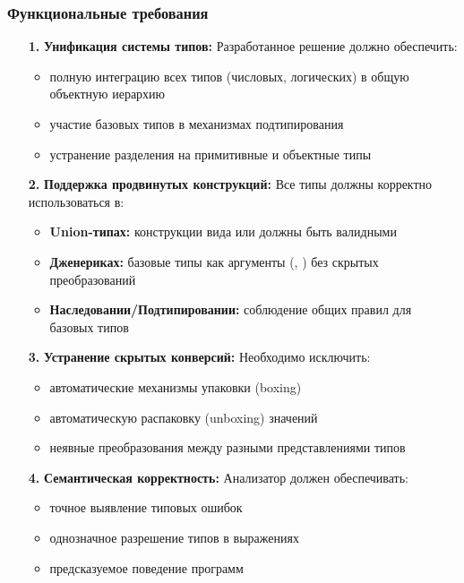\subsubsection{Функциональные требования}
\begin{enumerate}[leftmargin=*,align=left]
    \item[\textbf{1.}] \textbf{Унификация системы типов:} Разработанное решение должно обеспечить:
    \begin{itemize}[label={--}]
        \item полную интеграцию всех типов (числовых, логических) в общую объектную иерархию
        \item участие базовых типов в механизмах подтипирования
        \item устранение разделения на примитивные и объектные типы
    \end{itemize}

    \item[\textbf{2.}] \textbf{Поддержка продвинутых конструкций:} Все типы должны корректно использоваться в:
    \begin{itemize}[label={--}]
        \item \textbf{Union-типах:} конструкции вида  или  должны быть валидными
        \item \textbf{Дженериках:} базовые типы как аргументы (, ) без скрытых преобразований
        \item \textbf{Наследовании/Подтипировании:} соблюдение общих правил для базовых типов
    \end{itemize}

    \item[\textbf{3.}] \textbf{Устранение скрытых конверсий:} Необходимо исключить:
    \begin{itemize}[label={--}]
        \item автоматические механизмы упаковки (boxing)
        \item автоматическую распаковку (unboxing) значений
        \item неявные преобразования между разными представлениями типов
    \end{itemize}

    \item[\textbf{4.}] \textbf{Семантическая корректность:} Анализатор должен обеспечивать:
    \begin{itemize}[label={--}]
        \item точное выявление типовых ошибок
        \item однозначное разрешение типов в выражениях
        \item предсказуемое поведение программ
    \end{itemize}


\end{enumerate}
